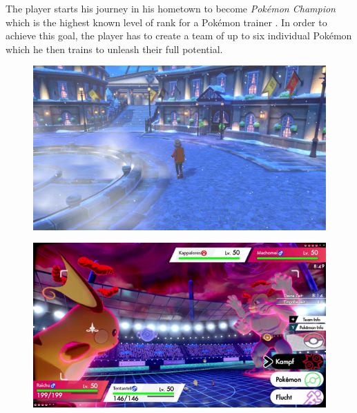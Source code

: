 The player starts his journey in his hometown to become \textit{Pokémon Champion} which is the highest known 
level of rank for a Pokémon trainer . In order
to achieve this goal, the player has to create a team of up to six individual Pokémon which he then trains 
to unleash their full potential. 
\begin{figure}
  \centering
  \begin{minipage}{.5\textwidth}
    \centering
    \includegraphics[width=.95\linewidth]{images/Sword-0.jpg}
    \label{fig:sword0}
  \end{minipage}%
  \begin{minipage}{.5\textwidth}
    \centering
    \includegraphics[width=.95\linewidth]{images/Sword-1.jpg}
    \label{fig:sword1}
  \end{minipage}
\end{figure}
